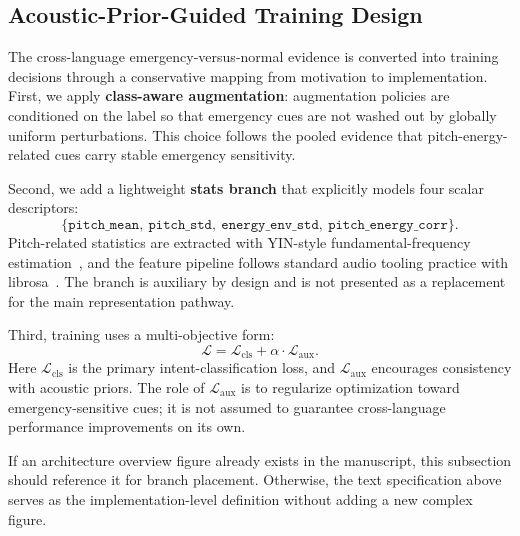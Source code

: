 \subsection{Acoustic-Prior-Guided Training Design}
The cross-language emergency-versus-normal evidence is converted into training decisions through a conservative mapping from motivation to implementation. First, we apply \textbf{class-aware augmentation}: augmentation policies are conditioned on the label so that emergency cues are not washed out by globally uniform perturbations. This choice follows the pooled evidence that pitch-energy-related cues carry stable emergency sensitivity.

Second, we add a lightweight \textbf{stats branch} that explicitly models four scalar descriptors:
\[
\{\texttt{pitch\_mean},\ \texttt{pitch\_std},\ \texttt{energy\_env\_std},\ \texttt{pitch\_energy\_corr}\}.
\]
Pitch-related statistics are extracted with YIN-style fundamental-frequency estimation~\cite{decheveigne2002yin}, and the feature pipeline follows standard audio tooling practice with librosa~\cite{mcfee2015librosa}. The branch is auxiliary by design and is not presented as a replacement for the main representation pathway.

Third, training uses a multi-objective form:
\[
\mathcal{L} = \mathcal{L}_{\text{cls}} + \alpha \cdot \mathcal{L}_{\text{aux}}.
\]
Here $\mathcal{L}_{\text{cls}}$ is the primary intent-classification loss, and $\mathcal{L}_{\text{aux}}$ encourages consistency with acoustic priors. The role of $\mathcal{L}_{\text{aux}}$ is to regularize optimization toward emergency-sensitive cues; it is not assumed to guarantee cross-language performance improvements on its own.

If an architecture overview figure already exists in the manuscript, this subsection should reference it for branch placement. Otherwise, the text specification above serves as the implementation-level definition without adding a new complex figure.
